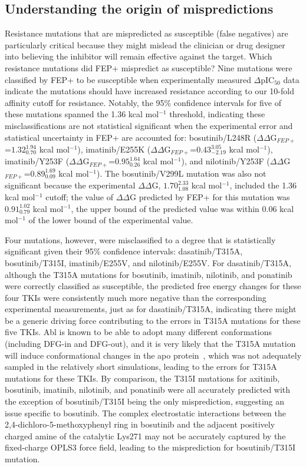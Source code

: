 \documentclass[phd,tocprelim]{cornell}
\begin{document}
\subsection{Understanding the origin of mispredictions}
Resistance mutations that are mispredicted as susceptible (false negatives) are particularly critical because they might mislead the clinician or drug designer into believing the inhibitor will remain effective against the target.
Which resistance mutations did FEP+ mispredict as susceptible?
Nine mutations were classified by FEP+ to be susceptible when experimentally measured $\Delta$pIC$_{50}$ data indicate the mutations should have increased resistance according to our 10-fold affinity cutoff for resistance.
Notably, the 95\% confidence intervals for five of these mutations spanned the 1.36 kcal mol$^{-1}$ threshold, indicating these misclassifications are not statistical significant when the experimental error and statistical uncertainty in FEP+ are accounted for:
bosutinib/L248R ($\Delta\Delta$G$_{FEP+}$=$1.32^{1.94}_{0.70}$ kcal mol$^{-1}$), 
imatinib/E255K ($\Delta\Delta$G$_{FEP+}$=$0.43^{3.05}_{-2.19}$ kcal mol$^{-1}$), 
imatinib/Y253F ($\Delta\Delta$G$_{FEP+}$=$0.95^{1.64}_{0.26}$ kcal mol$^{-1}$), 
and nilotinib/Y253F ($\Delta\Delta$G$_{FEP+}$=$0.89^{1.69}_{0.09}$ kcal mol$^{-1}$). 
The bosutinib/V299L mutation was also not significant because the experimental $\Delta\Delta$G, $1.70^{2.33}_{1.08}$ kcal mol$^{-1}$, included the 1.36 kcal mol$^{-1}$ cutoff; the value of $\Delta\Delta$G predicted by FEP+ for this mutation was $0.91^{1.02}_{0.79}$ kcal mol$^{-1}$, the upper bound of the predicted value was within 0.06 kcal mol$^{-1}$ of the lower bound of the experimental value.

Four mutations, however, were misclassified to a degree that is statistically significant given their 95\% confidence intervals:
dasatinib/T315A, bosutinib/T315I, imatinib/E255V, and nilotinib/E255V.
For dasatinib/T315A, although the T315A mutations for bosutinib, imatinib, nilotinib, and ponatinib were correctly classified as susceptible, the predicted free energy changes for these four TKIs were consistently much more negative than the corresponding experimental measurements, just as for dasatinib/T315A, indicating there might be a generic driving force contributing to the errors in T315A mutations for these five TKIs. 
Abl is known to be able to adopt many different conformations (including DFG-in and DFG-out), and it is very likely that the T315A mutation will induce conformational changes in the apo protein~\citep{Shan:Proc.Natl.Acad.Sci.:2009}, which was not adequately sampled in the relatively short simulations, leading to the errors for T315A mutations for these TKIs.    
By comparison, the T315I mutations for axitinib, bosutinib, imatinib, nilotinib, and ponatinib were all accurately predicted with the exception of bosutinib/T315I being the only misprediction, suggesting an issue specific to bosutinib.
The complex electrostatic interactions between the 2,4-dichloro-5-methoxyphenyl ring in bosutinib and the adjacent positively charged amine of the catalytic Lys271 may not be accurately captured by the fixed-charge OPLS3 force field, leading to the misprediction for bosutinib/T315I mutation.
\end{document}
